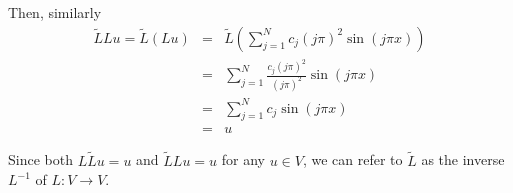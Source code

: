 \begin{solution}
\begin{enumerate}
Then, similarly
\begin{eqnarray*}
\tilde{L}Lu = \tilde{L}(Lu) &=& \tilde{L} \left(\sum_{j = 1}^N c_j (j\pi)^2 \sin( j \pi x)\right)\\
														 &=& \sum_{j = 1}^N \frac{c_j (j \pi)^2}{(j\pi)^2} \sin( j \pi x)\\
														 &=& \sum_{j = 1}^N c_j \sin( j \pi x)\\
														 &=&u
\end{eqnarray*}

Since both $L\tilde{L}u = u$ and $\tilde{L}Lu = u$ for any $u\in V$, we can refer to $\tilde{L}$ as the inverse $L^{-1}$ of $L:V\rightarrow V$.  

\end{enumerate}
\end{solution}